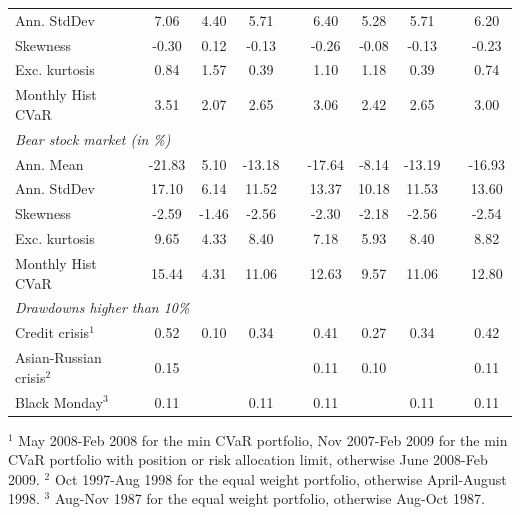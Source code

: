 \documentclass[12pt,a4paper]{article}
\begin{document}
\begin{table}[tb]
\begin{center}
{\begin{tabular}{|lc c c cccc c cc | }
 \multicolumn{2}{|l}{Ann. StdDev }       &    7.06 & 4.40 &5.71&& 6.40 & 5.28 & 5.71 &  & 6.20    \\
  \multicolumn{2}{|l}{Skewness }       &      -0.30 & 0.12 &-0.13&& -0.26 & -0.08 & -0.13 &  & -0.23   \\
    \multicolumn{2}{|l}{Exc. kurtosis }   &     0.84 & 1.57&0.39& & 1.10 & 1.18 & 0.39 &  & 0.74   \\
 \multicolumn{2}{|l}{Monthly Hist  CVaR}   &    3.51 & 2.07 &2.65&& 3.06 & 2.42 & 2.65 &  & 3.00 \\ \hline
 \multicolumn{11}{|l|}{\emph{Bear stock market (in \%)}} \\
 \multicolumn{2}{|l}{Ann. Mean  }    &      -21.83 & 5.10 & -13.18&& -17.64 & -8.14 & -13.19 &  & -16.93 \\
 \multicolumn{2}{|l}{Ann. StdDev}     &      17.10 & 6.14 &11.52&& 13.37 & 10.18 & 11.53 &  & 13.60   \\
  \multicolumn{2}{|l}{Skewness}     &         -2.59 & -1.46 & -2.56&& -2.30 & -2.18 & -2.56 & & -2.54   \\
    \multicolumn{2}{|l}{Exc. kurtosis}   &      9.65 & 4.33 &8.40&& 7.18 & 5.93 & 8.40 &  & 8.82     \\
 \multicolumn{2}{|l}{Monthly Hist  CVaR}   &	 15.44 & 4.31 &11.06 && 12.63 & 9.57 & 11.06 & & 12.80 \\\hline
\multicolumn{11}{|l|}{ \emph{Drawdowns higher than 10\%}  }  \\
 \multicolumn{2}{|l}{Credit crisis$^{1}$}       &  0.52 &  0.10 & 0.34&&  0.41 & 0.27 & 0.34 & & 0.42    \\
 \multicolumn{2}{|l}{Asian-Russian crisis$^{2}$}& 0.15     &  & &   &  0.11    & 0.10 &      &   & 0.11   \\
 \multicolumn{2}{|l}{ Black Monday$^{3}$}	& 0.11 &  & 0.11& &   0.11 &      & 0.11 &  & 0.11 \\
 \hline
\end{tabular}
}
\end{center}


{\scriptsize $^{1}$ May 2008-Feb 2008 for the min CVaR portfolio, Nov 2007-Feb 2009 for the min CVaR portfolio with position or risk allocation limit, otherwise June 2008-Feb 2009.  $^{2}$ Oct 1997-Aug 1998 for the equal weight portfolio, otherwise April-August 1998. $^{3}$ Aug-Nov 1987 for the equal weight portfolio, otherwise Aug-Oct 1987. }
\end{table}
\end{document}
